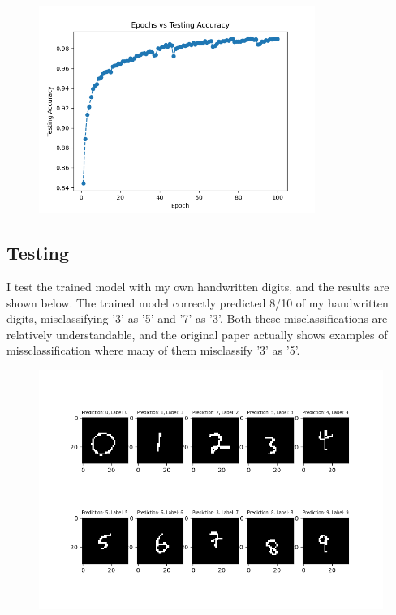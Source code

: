 \documentclass[11pt]{article}
\theoremstyle{definition}
\begin{document}
\begin{figure}[H]
\begin{center}
  \includegraphics[width=9cm,keepaspectratio]{images/test_acc.png}
\end{center}
\end{figure}


\subsection{Testing}

I test the trained model with my own handwritten digits, and the results are shown below. The trained model correctly predicted 8/10 of my handwritten digits, misclassifying '3' as '5' and '7' as '3'. Both these misclassifications are relatively understandable, and the original paper actually shows examples of missclassification where many of them misclassify '3' as '5'.


\begin{figure}[H]
\begin{center}
  \includegraphics[width=\linewidth,keepaspectratio]{images/my_results.png}
\end{center}
\end{figure}
\end{document}
